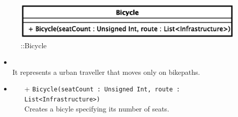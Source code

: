 \begin{figure}[h]
\centering
\includegraphics[scale=0.6,keepaspectratio]{images/solution/app/backend/bicycle.eps}
\caption{\pActive::Bicycle}
\label{fig:sd-app-bicycle}
\end{figure}
\FloatBarrier
\begin{itemize}
  \item \textbf{\descr} \\
It represents a urban traveller that moves only on bikepaths.
  \item \textbf{\ops}
  \begin{itemize}
  \item[+] \texttt{Bicycle(seatCount : Unsigned Int, route : List<Infrastructure>)} \\
Creates a bicyle specifying its number of seats.
  \end{itemize}
\end{itemize} 
